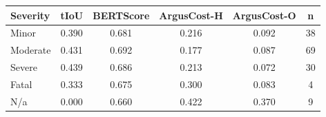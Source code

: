 \begin{tabular}{lccccc}
\toprule
Severity & tIoU & BERTScore & ArgusCost-H & ArgusCost-O & n \\
\midrule
Minor & 0.390 & 0.681 & 0.216 & 0.092 & 38 \\
Moderate & 0.431 & 0.692 & 0.177 & 0.087 & 69 \\
Severe & 0.439 & 0.686 & 0.213 & 0.072 & 30 \\
Fatal & 0.333 & 0.675 & 0.300 & 0.083 & 4 \\
N/a & 0.000 & 0.660 & 0.422 & 0.370 & 9 \\
\bottomrule
\end{tabular}

